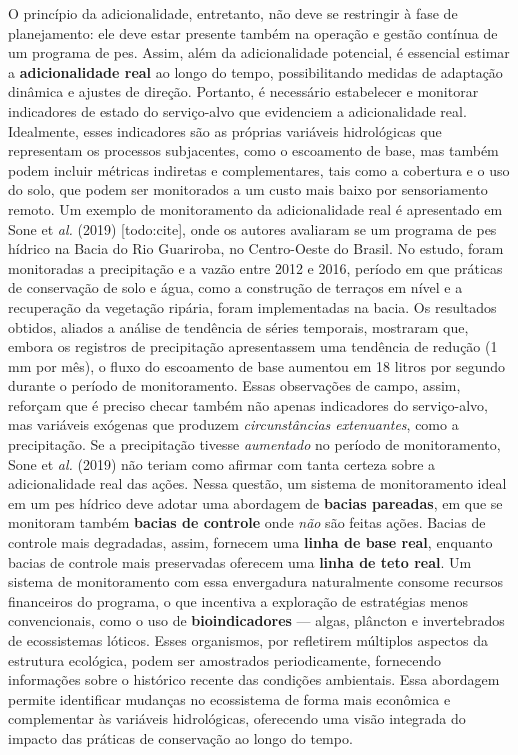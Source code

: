 \documentclass[./main.tex]{subfiles}
\begin{document}
\par O princípio da adicionalidade, entretanto, não deve se restringir à fase de planejamento: ele deve estar presente também na operação e gestão contínua de um programa de \acrshort{pes}. Assim, além da adicionalidade potencial, é essencial estimar a \textbf{adicionalidade real} ao longo do tempo, possibilitando medidas de adaptação dinâmica e ajustes de direção. Portanto, é necessário estabelecer e monitorar indicadores de estado do serviço-alvo que evidenciem a adicionalidade real. Idealmente, esses indicadores são as próprias variáveis hidrológicas que representam os processos subjacentes, como o escoamento de base, mas também podem incluir métricas indiretas e complementares, tais como a cobertura e o uso do solo, que podem ser monitorados a um custo mais baixo por sensoriamento remoto. Um exemplo de monitoramento da adicionalidade real é apresentado em Sone et \textit{al.} (2019) [todo:cite], onde os autores avaliaram se um programa de \acrshort{pes} hídrico na Bacia do Rio Guariroba, no Centro-Oeste do Brasil. No estudo, foram monitoradas a precipitação e a vazão entre 2012 e 2016, período em que práticas de conservação de solo e água, como a construção de terraços em nível e a recuperação da vegetação ripária, foram implementadas na bacia. Os resultados obtidos, aliados a análise de tendência de séries temporais, mostraram que, embora os registros de precipitação apresentassem uma tendência de redução (1 mm por mês), o fluxo do escoamento de base aumentou em 18 litros por segundo durante o período de monitoramento. Essas observações de campo, assim, reforçam que é preciso checar também não apenas indicadores do serviço-alvo, mas variáveis exógenas que produzem \textit{circunstâncias extenuantes}, como a precipitação. Se a precipitação tivesse \textit{aumentado} no período de monitoramento, Sone et \textit{al.} (2019) não teriam como afirmar com tanta certeza sobre a adicionalidade real das ações. Nessa questão, um sistema de monitoramento ideal em um \acrshort{pes} hídrico deve adotar uma abordagem de \textbf{bacias pareadas}, em que se monitoram também \textbf{bacias de controle} onde \textit{não} são feitas ações. Bacias de controle mais degradadas, assim, fornecem uma \textbf{linha de base real}, enquanto bacias de controle mais preservadas oferecem uma \textbf{linha de teto real}. Um sistema de monitoramento com essa envergadura naturalmente consome recursos financeiros do programa, o que incentiva a exploração de estratégias menos convencionais, como o uso de \textbf{bioindicadores} — algas, plâncton e invertebrados de ecossistemas lóticos. Esses organismos, por refletirem múltiplos aspectos da estrutura ecológica, podem ser amostrados periodicamente, fornecendo informações sobre o histórico recente das condições ambientais. Essa abordagem permite identificar mudanças no ecossistema de forma mais econômica e complementar às variáveis hidrológicas, oferecendo uma visão integrada do impacto das práticas de conservação ao longo do tempo. 
\end{document}

